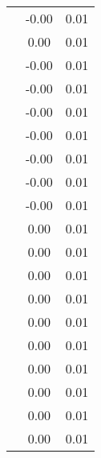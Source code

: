 \begin{table}
\begin{tabular}{c|cc|}
\multicolumn{1}{|c|}{} & \multicolumn{1}{|c|}{     -0.00} & \multicolumn{1}{|c|}{      0.01} \\ 
\multicolumn{1}{|c|}{} & \multicolumn{1}{|c|}{      0.00} & \multicolumn{1}{|c|}{      0.01} \\ 
\multicolumn{1}{|c|}{} & \multicolumn{1}{|c|}{     -0.00} & \multicolumn{1}{|c|}{      0.01} \\ 
\multicolumn{1}{|c|}{} & \multicolumn{1}{|c|}{     -0.00} & \multicolumn{1}{|c|}{      0.01} \\ 
\multicolumn{1}{|c|}{} & \multicolumn{1}{|c|}{     -0.00} & \multicolumn{1}{|c|}{      0.01} \\ 
\multicolumn{1}{|c|}{} & \multicolumn{1}{|c|}{     -0.00} & \multicolumn{1}{|c|}{      0.01} \\ 
\multicolumn{1}{|c|}{} & \multicolumn{1}{|c|}{     -0.00} & \multicolumn{1}{|c|}{      0.01} \\ 
\multicolumn{1}{|c|}{} & \multicolumn{1}{|c|}{     -0.00} & \multicolumn{1}{|c|}{      0.01} \\ 
\multicolumn{1}{|c|}{} & \multicolumn{1}{|c|}{     -0.00} & \multicolumn{1}{|c|}{      0.01} \\ 
\multicolumn{1}{|c|}{} & \multicolumn{1}{|c|}{      0.00} & \multicolumn{1}{|c|}{      0.01} \\ 
\multicolumn{1}{|c|}{} & \multicolumn{1}{|c|}{      0.00} & \multicolumn{1}{|c|}{      0.01} \\ 
\multicolumn{1}{|c|}{} & \multicolumn{1}{|c|}{      0.00} & \multicolumn{1}{|c|}{      0.01} \\ 
\multicolumn{1}{|c|}{} & \multicolumn{1}{|c|}{      0.00} & \multicolumn{1}{|c|}{      0.01} \\ 
\multicolumn{1}{|c|}{} & \multicolumn{1}{|c|}{      0.00} & \multicolumn{1}{|c|}{      0.01} \\ 
\multicolumn{1}{|c|}{} & \multicolumn{1}{|c|}{      0.00} & \multicolumn{1}{|c|}{      0.01} \\ 
\multicolumn{1}{|c|}{} & \multicolumn{1}{|c|}{      0.00} & \multicolumn{1}{|c|}{      0.01} \\ 
\multicolumn{1}{|c|}{} & \multicolumn{1}{|c|}{      0.00} & \multicolumn{1}{|c|}{      0.01} \\ 
\multicolumn{1}{|c|}{} & \multicolumn{1}{|c|}{      0.00} & \multicolumn{1}{|c|}{      0.01} \\ 
\multicolumn{1}{|c|}{} & \multicolumn{1}{|c|}{      0.00} & \multicolumn{1}{|c|}{      0.01} \\ 

\end{tabular}
\end{table}
